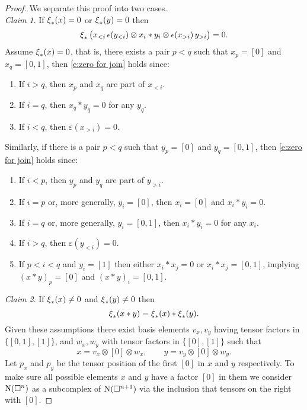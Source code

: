 \begin{proof}
	We separate this proof into two cases. \\
	\textit{Claim 1}. If $\operatorname{\xi}_\ast(x) = 0$ or $\operatorname{\xi}_\ast(y) = 0$ then
	\begin{equation} \label{e:zero for join}
	\operatorname{\xi}_\ast \big( x_{<i}\, \epsilon(y_{<i}) \otimes x_i \ast y_i \otimes \epsilon(x_{>i}) \, y_{>i} \big) = 0.
	\end{equation}
	Assume $\operatorname{\xi}_\ast(x) = 0$, that is, there exists a pair $p < q$ such that $x_p = [0]$ and $x_q = [0,1]$, then \eqref{e:zero for join} holds since:
	\begin{enumerate}
		\item If $i > q$, then $x_p$ and $x_q$ are part of $x_{<i}$.
		\item If $i = q$, then $x_q \ast y_q = 0$ for any $y_q$.
		\item If $i < q$, then $\varepsilon(x_{>i}) = 0$.
	\end{enumerate}
	Similarly, if there is a pair $p < q$ such that $y_p = [0]$ and $y_q = [0,1]$,  then \eqref{e:zero for join} holds since:
	\begin{enumerate}
		\item If $i < p$, then $y_p$ and $y_q$ are part of $y_{>i}$.
		\item If $i = p$ or, more generally, $y_i = [0]$, then $x_i = [0]$ and $x_i \ast y_i = 0$.
		\item If $i = q$ or, more generally, $y_i = [0,1]$, then $x_i \ast y_i = 0$ for any $x_i$.
		\item If $i > q$, then $\varepsilon(y_{<i}) = 0$.
		\item If $p < i < q$ and $y_i = [1]$ then either $x_i \ast x_j = 0$ or $x_i \ast x_j = [0,1]$, implying $(x \ast y)_p = [0]$ and $(x \ast y)_i = [0,1]$.
	\end{enumerate}
	\textit{Claim 2}. If $\operatorname{\xi}_\ast(x) \neq 0$ and $\operatorname{\xi}_\ast(y) \neq 0$ then
	\[
	\operatorname{\xi}_\ast(x \ast y) =
	\operatorname{\xi}_\ast(x) \ast \operatorname{\xi}_\ast(y).
	\]
	Given these assumptions there exist basis elements $v_x, v_y$ having tensor factors in $\{[0,1], [1]\}$, and $w_x, w_y$ with tensor factors in $\{[0], [1]\}$ such that
	\[
	x = v_x \otimes [0] \otimes w_x, \qquad
	y = v_y \otimes [0] \otimes w_y.
	\]
	Let $p_x$ and $p_y$ be the tensor position of the first $[0]$ in $x$ and $y$ respectively.
	To make sure all possible elements $x$ and $y$ have a factor $[0]$ in them we consider $\operatorname{N}(\square^n)$ as a subcomplex of $\operatorname{N}(\square^{n+1})$ via the inclusion that tensors on the right with $[0]$.

\end{proof}
